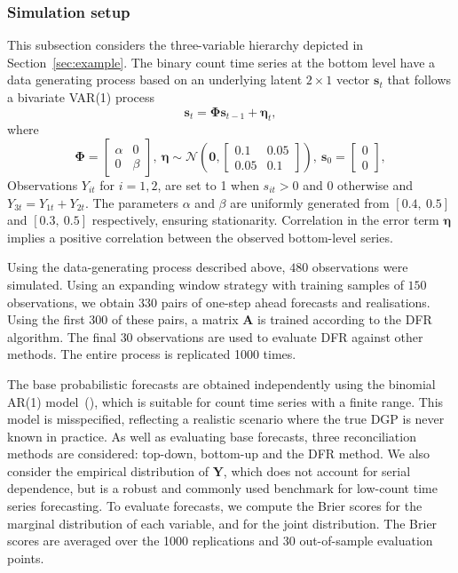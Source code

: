 \documentclass[a4paper,review,12pt,authoryear]{elsarticle}
\theoremstyle{definition}
\begin{document}
    \subsubsection{Simulation setup}
    This subsection considers the three-variable hierarchy depicted in Section~\ref{sec:example}. The binary count time series at the bottom level have a data generating process based on an underlying latent $2\times 1$ vector $\mathbf{s}_t$ that follows a bivariate VAR(1) process
    \[\mathbf{s}_t = \mathbf{\Phi}\mathbf{s}_{t-1}+\boldsymbol{\eta}_t,\]
    where
    \[
      \mathbf{\Phi} = \left[\begin{matrix}
        \alpha & 0 \\
        0 & \beta
      \end{matrix}\right], ~ \boldsymbol{\eta} \sim \mathcal{N}\left(\mathbf{0}, \left[\begin{matrix}
        0.1 & 0.05 \\
        0.05 & 0.1
      \end{matrix}\right]\right), ~ \mathbf{s}_{0} = \left[
        \begin{matrix}0 \\ 0\end{matrix}
      \right],
    \]
    Observations $Y_{it}$ for $i=1,2$, are set to 1 when $s_{it}>0$ and 0 otherwise and $Y_{3t}=Y_{1t}+Y_{2t}$. The parameters $\alpha$ and $\beta$ are uniformly generated from $[0.4, ~ 0.5]$ and $[0.3, ~ 0.5]$ respectively, ensuring stationarity. Correlation in the error term $\boldsymbol{\eta}$ implies a positive correlation between the observed bottom-level series.

   
    Using the data-generating process described above, $480$ observations were simulated. Using an expanding window strategy with training samples of $150$ observations, we obtain $330$ pairs of one-step ahead forecasts and realisations. Using the first $300$ of these pairs, a matrix $\mathbf{A}$ is trained according to the DFR algorithm. The final $30$ observations are used to evaluate DFR against other methods. The entire process is replicated 1000 times.
    

    The base probabilistic forecasts are obtained independently using the binomial AR(1) model~(\citealp{weissParameterEstimationBinomial2013}), which is suitable for count time series with a finite range. This model is misspecified, reflecting a realistic scenario where the true DGP is never known in practice. As well as evaluating base forecasts, three reconciliation methods are considered: top-down, bottom-up and the DFR method. We also consider the empirical distribution of $\mathbf{Y}$, which does not account for serial dependence, but is a robust and commonly used benchmark for low-count time series forecasting. To evaluate forecasts, we compute the Brier scores for the marginal distribution of each variable, and for the joint distribution. The Brier scores are averaged over the 1000 replications and 30 out-of-sample evaluation points.
\end{document}
